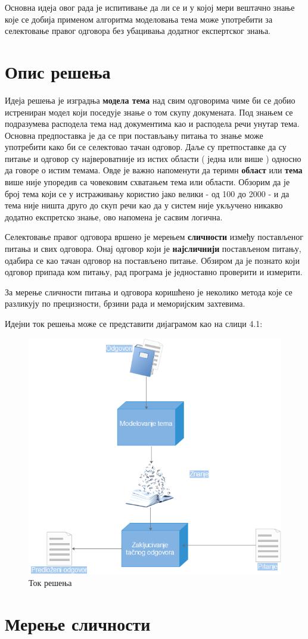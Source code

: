 Основна идеја овог рада је испитивање да ли се и у којој мери вештачно знање које се добија применом алгоритма моделовања тема може употребити за селектовање правог одговора без убацивања додатног експертског знања.


\section{Опис решења}

Идеја решења је изградња \textbf{модела тема} над свим одговорима чиме би се добио истрениран модел који поседује знање о том скупу докумената. Под знањем се подразумева расподела тема над документима као и расподела речи унутар тема. Основна предпоставка је да се при постављању питања то знање може употребити како би се селектовао тачан одговор. Даље су претпоставке да су  питање и одговор су највероватније из истих области ( једна или више ) односно да говоре о истим темама. Овде је важно напоменути да теримн \textbf{област} или \textbf{тема} више није упоредив са човековим схватањем тема или области. Обзорим да је број тема који се у истраживању користио јако велики - од 100 до 2000 - и да тема није ништа друго до скуп речи као да у систем није укључено никакво додатно експретско знање, ово напомена је сасвим логична.

Селектовање правог одговора вршено је мерењем \textbf{сличности} између постављеног питања и свих одговора. Онај одговор који је \textbf{најсличнији} постављеном питању, одабира се као тачан одговор на постављено питање. Обзиром да је познато који одговор припада ком питању, рад програма је једноставно проверити и измерити.

За мерење сличности питања и одговора коришћено је неколико метода које се разликују  по прецизности, брзини рада и меморијским захтевима. 


Идејни ток решења може се представити  дијаграмом као на слици 4.1:

\begin{figure}[H]
    \centering
   \includegraphics[scale=0.9]{./Slike/slika37.png} 
	\caption{Ток решења}
	\label{fig:slika1}
\end{figure}


\section{Мерење сличности}



